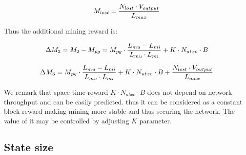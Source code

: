 \documentclass[]{llncs}   %
\newcommand{\esse}{\textit{SSE}}
\newcommand{\ignore}[1]{} %
\begin{document}
\begin{equation}
M_{lost} = {N_{lost} \cdot V_{output} \over L_{max}}
\end{equation}

Thus the additional mining reward is:

\begin{equation}
\Delta M_2 = M_2 - M_{pg} = M_{pg} \cdot {{L_{mu}-L_{mi}} \over {L_{mu} \cdot L_{mi}}} + K \cdot N_{utxo} \cdot B
\end{equation}

\begin{equation}
\Delta M_3 = M_{pg} \cdot {{L_{mu}-L_{mi}} \over {L_{mu} \cdot L_{mi}}} + K \cdot N_{utxo} \cdot B + {N_{lost} \cdot V_{output} \over L_{max}}
\end{equation}

\ignore{
  \begin{equation}
  \label{eq:reward}
    M_{reward} \approx M_{pg} + (K \cdot B) \cdot ((1 + r_{flow}) \cdot N_{utxo} + r_{mode} \cdot N_{lost})
  \end{equation}

  First part of this equation $M_{pg}$ is the reward of miner in existing fee models, the rest is the unique reward for \esse{} model.  In a sensible assumption $N_{utxo} >> N_{lost}$ equation \ref{eq:reward} can be simplified to

  \begin{equation}
    M_{postpaid} \approx M_{pg} + K \cdot B \cdot N_{utxo} \cdot (1 + M)
  \end{equation}

  that allows to estimate such $K$, when additional \esse{} reward will exceed common propagation reward $M_{pg}$:

  \begin{equation}
    K = {M_{pg} \over B \cdot N_{utxo} \cdot (1 + M)} \approx 10^{-9} ({BTC / (Byte \cdot Block)})
  \end{equation}

  that is naturally coincide to estimations from section \ref{eq:ltmean} while miner reward equals to user losses.
}

We remark that space-time reward $K \cdot N_{utxo} \cdot B$ does not depend on network throughput and can be easily predicted. thus it can be considered as a constant block reward making mining more stable and thus securing the network. The value of it may be controlled by adjusting $K$ parameter.

\subsection{State size}
\end{document}
